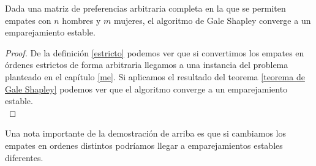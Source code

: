\begin{cor}
Dada una matriz de preferencias arbitraria completa en la que se permiten empates con $n$ hombres y $m$ mujeres, el algoritmo de Gale Shapley converge a un emparejamiento estable.
\end{cor}
\begin{proof}
De la definición \ref{estricto} podemos ver que si convertimos los empates en órdenes estrictos de forma arbitraria llegamos a una instancia del problema planteado en el capítulo \ref{me}. Si aplicamos el resultado del teorema \ref{teorema de Gale Shapley} podemos ver que el algoritmo converge a un emparejamiento estable. \\
\end{proof}

Una nota importante de la demostración de arriba es que si cambiamos los empates en ordenes distintos podríamos llegar a emparejamientos estables diferentes. 





